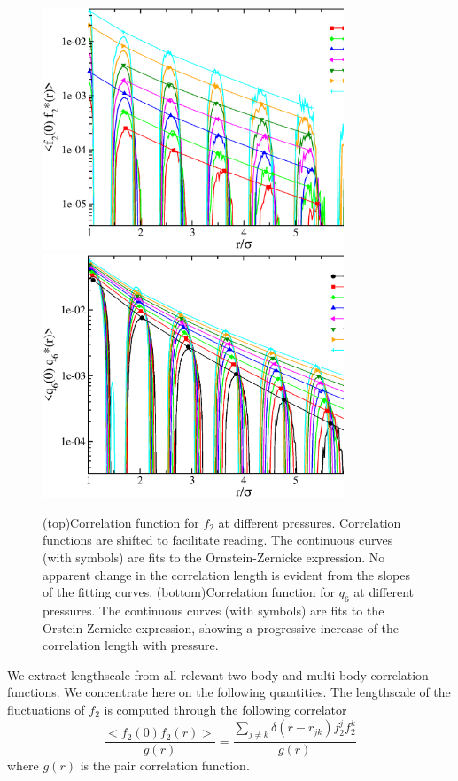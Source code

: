 \documentclass[twocolumn,superscriptaddress]{revtex4-1}
\begin{document}
\begin{figure}
 \centering
 \includegraphics[width=9cm]{./figures/f2_corr.eps}
 \includegraphics[width=9cm]{./figures/q6_vectorcorr.eps}
 \caption{(top)Correlation function for $f_2$ at different pressures. Correlation functions are shifted
to facilitate reading. The continuous curves (with symbols) are fits to the Ornstein-Zernicke expression.
No apparent change in the correlation length is evident from the slopes of the fitting curves.
(bottom)Correlation function for $q_6$ at different pressures. The continuous curves (with symbols) are fits to the Orstein-Zernicke expression,
showing a progressive increase of the correlation length with pressure.}
 \label{fig:corr}
\end{figure}

We extract lengthscale from all relevant two-body and multi-body correlation functions.
We concentrate here on the following quantities.
The lengthscale of the fluctuations of $f_2$
is computed through the following correlator
\begin{equation}
\frac{<f_2(0)f_2(r)>}{g(r)}=\frac{\sum_{j\neq k}\delta(r-r_{jk})f_2^jf_2^k}{g(r)}
\end{equation}
where $g(r)$ is the pair correlation function.
\end{document}
